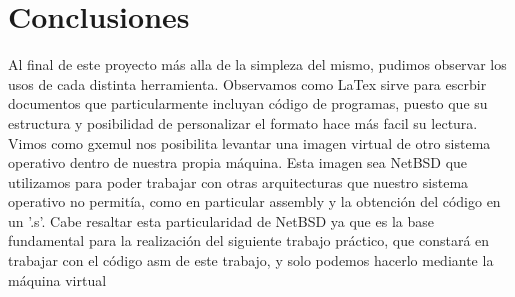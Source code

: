 \documentclass[10pt,a4paper]{article}
\begin{document}


\section{Conclusiones}

Al final de este proyecto más alla de la simpleza del mismo, pudimos observar los usos de cada distinta herramienta. Observamos como LaTex sirve para escrbir documentos que particularmente incluyan código de programas, puesto que su estructura y posibilidad de personalizar el formato hace más facil su lectura. Vimos como gxemul nos posibilita levantar una imagen virtual de otro sistema operativo dentro de nuestra propia máquina. Esta imagen sea NetBSD que utilizamos para poder trabajar con otras arquitecturas que nuestro sistema operativo no permitía, como en particular assembly y la obtención del código en un '.s'. Cabe resaltar esta particularidad de NetBSD  ya que es la base fundamental para la realización del siguiente trabajo práctico, que constará en trabajar con el código asm de este trabajo, y solo podemos hacerlo mediante la máquina virtual
\end{document}
